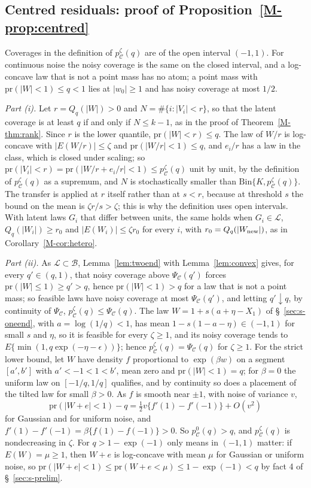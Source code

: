 \documentclass[12pt]{article}
\renewcommand{\_}{\usc\allowbreak}
\theoremstyle{definition}
\numberwithin{equation}{section}
\newcommand{\pr}{\mathrm{pr}}
\newcommand{\LC}{\mathcal{L}}
\newcommand{\B}{\mathcal{B}}
\newcommand{\E}{\mathcal{C}}
\newcommand{\Bin}{\mathrm{Bin}}
\begin{document}
\subsection{Centred residuals: proof of Proposition~\ref{M-prop:centred}}\label{sec:s-centred}

Coverages in the definition of $p^\zeta_{\E}(q)$ are of the open interval $(-1, 1)$. For continuous noise the noisy coverage is the same on the closed interval, and a log-concave law that is not a point mass has no atom; a point mass with $\pr(|W| < 1) \le q < 1$ lies at $|w_0| \ge 1$ and has noisy coverage at most $1/2$.

\emph{Part (i).} Let $r = Q_q(|W|) > 0$ and $N = \#\{i : |V_i| < r\}$, so that the latent coverage is at least $q$ if and only if $N \le k - 1$, as in the proof of Theorem~\ref{M-thm:rank}. Since $r$ is the lower quantile, $\pr(|W| < r) \le q$. The law of $W/r$ is log-concave with $|E(W/r)| \le \zeta$ and $\pr(|W/r| < 1) \le q$, and $e_i/r$ has a law in the class, which is closed under scaling; so $\pr(|V_i| < r) = \pr(|W/r + e_i/r| < 1) \le p^\zeta_{\E}(q)$ unit by unit, by the definition of $p^\zeta_{\E}(q)$ as a supremum, and $N$ is stochastically smaller than $\Bin\{K, p^\zeta_{\E}(q)\}$. The transfer is applied at $r$ itself rather than at $s < r$, because at threshold $s$ the bound on the mean is $\zeta r/s > \zeta$; this is why the definition uses open intervals. With latent laws $G_i$ that differ between units, the same holds when $G_i \in \LC$, $Q_q(|W_i|) \ge r_0$ and $|E(W_i)| \le \zeta r_0$ for every $i$, with $r_0 = Q_q(|W_{\rm new}|)$, as in Corollary~\ref{M-cor:hetero}.

\emph{Part (ii).} As $\LC \subset \B$, Lemma~\ref{lem:twoend} with Lemma~\ref{lem:convex} gives, for every $q' \in (q, 1)$, that noisy coverage above $\Psi_{\E}(q')$ forces $\pr(|W| \le 1) \ge q' > q$, hence $\pr(|W| < 1) > q$ for a law that is not a point mass; so feasible laws have noisy coverage at most $\Psi_{\E}(q')$, and letting $q' \downarrow q$, by continuity of $\Psi_{\E}$, $p^\zeta_{\E}(q) \le \Psi_{\E}(q)$. The law $W = 1 + s(a + \eta - X_1)$ of \S~\ref{sec:s-oneend}, with $a = \log(1/q) < 1$, has mean $1 - s(1 - a - \eta) \in (-1, 1)$ for small $s$ and $\eta$, so it is feasible for every $\zeta \ge 1$, and its noisy coverage tends to $E\{\min(1, q\exp(-\eta - \epsilon))\}$; hence $p^\zeta_{\E}(q) = \Psi_{\E}(q)$ for $\zeta \ge 1$. For the strict lower bound, let $W$ have density $f$ proportional to $\exp(\beta w)$ on a segment $[a', b']$ with $a' < -1 < 1 < b'$, mean zero and $\pr(|W| < 1) = q$; for $\beta = 0$ the uniform law on $[-1/q, 1/q]$ qualifies, and by continuity so does a placement of the tilted law for small $\beta > 0$. As $f$ is smooth near $\pm 1$, with noise of variance $v$,
\[
\pr(|W + e| < 1) - q = \tfrac12 v\{f'(1) - f'(-1)\} + O(v^2)
\]
for Gaussian and for uniform noise, and $f'(1) - f'(-1) = \beta\{f(1) - f(-1)\} > 0$. So $p^0_{\E}(q) > q$, and $p^\zeta_{\E}(q)$ is nondecreasing in $\zeta$. For $q > 1 - \exp(-1)$ only means in $(-1, 1)$ matter: if $E(W) = \mu \ge 1$, then $W + e$ is log-concave with mean $\mu$ for Gaussian or uniform noise, so $\pr(|W + e| < 1) \le \pr(W + e < \mu) \le 1 - \exp(-1) < q$ by fact 4 of \S~\ref{sec:s-prelim}.
\end{document}

